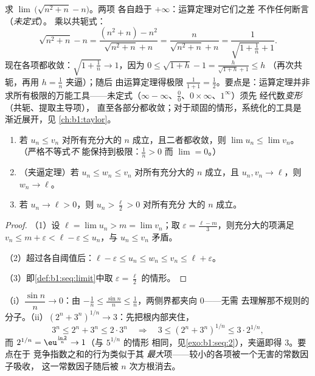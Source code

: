 \begin{example}[运算法则加一个代数技巧]\label{ex:b1:seq:conjugatetrick}
求 $\lim\,\bigl(\sqrt{n^2 + n} - n\bigr)$。两项
各自趋于 $+\infty$：运算定理对它们之差
不作任何断言（\emph{未定式}）。
乘以共轭式：
\[
\sqrt{n^2 + n} - n
= \frac{(n^2 + n) - n^2}{\sqrt{n^2 + n} + n}
= \frac{n}{\sqrt{n^2+n} + n}
= \frac{1}{\sqrt{1 + \frac1n} + 1} .
\]
现在各项都收敛：$\sqrt{1 + \frac1n} \to 1$，因为
$0 \leq \sqrt{1 + h} - 1 = \frac{h}{\sqrt{1+h} + 1} \leq h$
（再次共轭，再用 $h = \frac1n$ 夹逼）；随后
由运算定理得极限 $\frac{1}{1 + 1} =
\frac12$。要点是：运算定理并非
求所有极限的万能工具——未定式（$\infty -
\infty$、$\frac00$、$0 \times \infty$、$1^\infty$）须先
经代数\emph{变形}（共轭、提取主导项），
直至各部分都收敛；对于顽固的情形，系统化的工具是
渐近展开，见
\cref{ch:b1:taylor}。
\end{example}

\begin{theorem}[极限与序关系]\label{thm:b1:seq:order}
\begin{enumerate}
  \item 若 $u_n \leq v_n$ 对所有充分大的 $n$ 成立，且二者都收敛，则
        $\lim u_n \leq \lim v_n$。（严格不等式\emph{不}
        能保持到极限：$\frac 1n > 0$ 而 $\lim = 0$。）
  \item （夹逼定理）若 $u_n \leq w_n
        \leq v_n$ 对所有充分大的 $n$ 成立，且 $u_n, v_n \to \ell$，则
        $w_n \to \ell$。
  \item 若 $u_n \to \ell > 0$，则 $u_n > \frac\ell2 > 0$ 对所有充分
        大的 $n$ 成立。
\end{enumerate}
\end{theorem}

\begin{proof}
（1）设 $\ell = \lim u_n > m = \lim v_n$；取 $\varepsilon =
\frac{\ell - m}{3}$，则充分大的项满足 $v_n \leq m + \varepsilon <
\ell - \varepsilon \leq u_n$，与 $u_n \leq v_n$ 矛盾。

（2）超过各自阈值后：$\ell - \varepsilon \leq u_n \leq w_n \leq
v_n \leq \ell + \varepsilon$。

（3）即\cref{def:b1:seq:limit}中取 $\varepsilon = \frac\ell2$ 的情形。
\end{proof}

\begin{example}[两次夹逼]\label{ex:b1:seq:squeezes}
（i）$\dfrac{\sin n}{n} \to 0$：由 $-\frac1n \leq \frac{\sin
n}{n} \leq \frac1n$，两侧界都夹向 $0$——无需
去理解那不规则的分子。（ii）$(2^n +
3^n)^{1/n} \to 3$：先把根内部夹住，
\[
3^n \leq 2^n + 3^n \leq 2\cdot3^n
\quad\Longrightarrow\quad
3 \leq (2^n + 3^n)^{1/n} \leq 3\cdot 2^{1/n} ,
\]
而 $2^{1/n} = \eu^{\frac{\ln 2}{n}} \to 1$（与 $5^{1/n}$ 的情形
相同，见\cref{exo:b1:seq:2}），夹逼即得 $3$。要点在于
竞争指数之和的行为类似于其
\emph{最大}项——较小的各项被一个无害的常数因子吸收，
这一常数因子随后被 $n$ 次方根消去。
\end{example}

